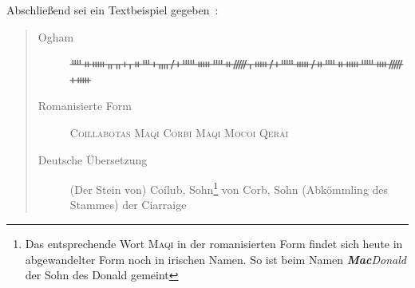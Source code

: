 \documentclass[a4paper]{scrartcl}
\begin{document}
Abschließend sei ein Textbeispiel gegeben~\cite{ogham-wiki-de}:
\begin{quote}
  \begin{description}
    \item[Ogham] {\oghamfont ᚉᚑᚔᚂᚂᚐᚁᚑᚈᚐᚄᚋᚐᚊᚔᚉᚑᚏᚁᚔᚋᚐᚊᚔᚋᚑᚉᚑᚔᚊᚓᚏᚐᚔ}
    \item[Romanisierte Form] \textsc{Coillabotas Maqi Corbi Maqi Mocoi Qerai}
    \item[Deutsche Übersetzung] {\glqq(Der Stein von) Coílub, Sohn\footnote{Das entsprechende Wort \textsc{Maqi} in der romanisierten Form findet sich heute in abgewandelter Form noch in irischen Namen. So ist beim Namen \emph{\textbf{Mac}Donald} der {\glqq Sohn des Donald\grqq} gemeint} von Corb, Sohn (Abkömmling des Stammes) der Ciarraige\grqq}
  \end{description}
\end{quote}

\sloppy\printbibliography
\end{document}
